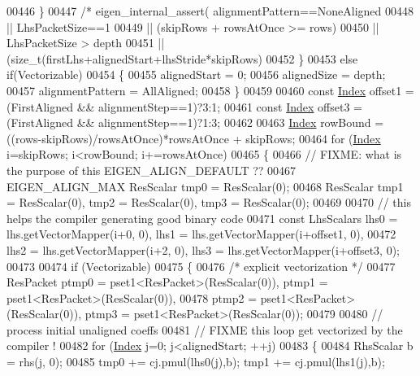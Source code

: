 \begin{DoxyCode}
{00446     \}
00447     \textcolor{comment}{/*    eigen\_internal\_assert(  alignmentPattern==NoneAligned}
00448 \textcolor{comment}{                      || LhsPacketSize==1}
00449 \textcolor{comment}{                      || (skipRows + rowsAtOnce >= rows)}
00450 \textcolor{comment}{                      || LhsPacketSize > depth}
00451 \textcolor{comment}{                      || (size\_t(firstLhs+alignedStart+lhsStride*skipRows)%
00452   \}
00453   \textcolor{keywordflow}{else} \textcolor{keywordflow}{if}(Vectorizable)
00454   \{
00455     alignedStart = 0;
00456     alignedSize = depth;
00457     alignmentPattern = AllAligned;
00458   \}
00459 
00460   \textcolor{keyword}{const} \hyperlink{namespace_eigen_a62e77e0933482dafde8fe197d9a2cfde}{Index} offset1 = (FirstAligned && alignmentStep==1)?3:1;
00461   \textcolor{keyword}{const} \hyperlink{namespace_eigen_a62e77e0933482dafde8fe197d9a2cfde}{Index} offset3 = (FirstAligned && alignmentStep==1)?1:3;
00462 
00463   \hyperlink{namespace_eigen_a62e77e0933482dafde8fe197d9a2cfde}{Index} rowBound = ((rows-skipRows)/rowsAtOnce)*rowsAtOnce + skipRows;
00464   \textcolor{keywordflow}{for} (\hyperlink{namespace_eigen_a62e77e0933482dafde8fe197d9a2cfde}{Index} i=skipRows; i<rowBound; i+=rowsAtOnce)
00465   \{
00466     \textcolor{comment}{// FIXME: what is the purpose of this EIGEN\_ALIGN\_DEFAULT ??}
00467     EIGEN\_ALIGN\_MAX ResScalar tmp0 = ResScalar(0);
00468     ResScalar tmp1 = ResScalar(0), tmp2 = ResScalar(0), tmp3 = ResScalar(0);
00469 
00470     \textcolor{comment}{// this helps the compiler generating good binary code}
00471     \textcolor{keyword}{const} LhsScalars lhs0 = lhs.getVectorMapper(i+0, 0),    lhs1 = lhs.getVectorMapper(i+offset1, 0),
00472                      lhs2 = lhs.getVectorMapper(i+2, 0),    lhs3 = lhs.getVectorMapper(i+offset3, 0);
00473 
00474     \textcolor{keywordflow}{if} (Vectorizable)
00475     \{
00476       \textcolor{comment}{/* explicit vectorization */}
00477       ResPacket ptmp0 = pset1<ResPacket>(ResScalar(0)), ptmp1 = pset1<ResPacket>(ResScalar(0)),
00478                 ptmp2 = pset1<ResPacket>(ResScalar(0)), ptmp3 = pset1<ResPacket>(ResScalar(0));
00479 
00480       \textcolor{comment}{// process initial unaligned coeffs}
00481       \textcolor{comment}{// FIXME this loop get vectorized by the compiler !}
00482       \textcolor{keywordflow}{for} (\hyperlink{namespace_eigen_a62e77e0933482dafde8fe197d9a2cfde}{Index} j=0; j<alignedStart; ++j)
00483       \{
00484         RhsScalar b = rhs(j, 0);
00485         tmp0 += cj.pmul(lhs0(j),b); tmp1 += cj.pmul(lhs1(j),b);
}}
\end{DoxyCode}
